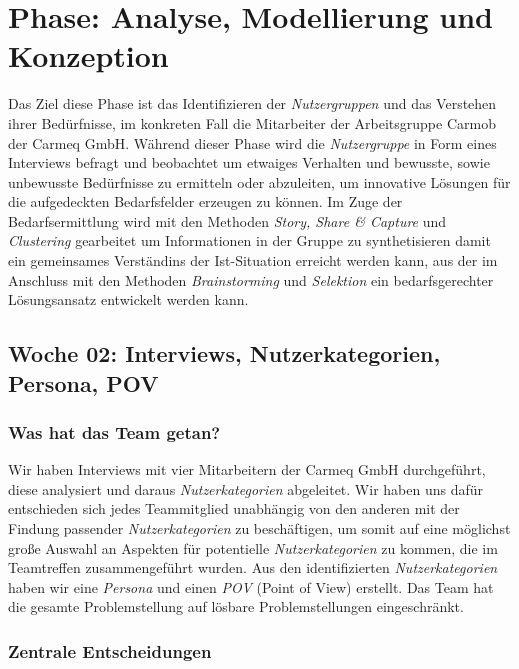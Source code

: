 \documentclass{article}
\begin{document}


\section{Phase: Analyse, Modellierung und Konzeption}

Das Ziel diese Phase ist das Identifizieren der \textit{Nutzergruppen} und das Verstehen ihrer Bed\"urfnisse, im konkreten Fall die Mitarbeiter der Arbeitsgruppe Carmob der Carmeq GmbH. W\"ahrend dieser Phase wird die \textit{Nutzergruppe} in Form eines Interviews befragt und beobachtet um etwaiges Verhalten und bewusste, sowie unbewusste Bed\"urfnisse zu ermitteln oder abzuleiten, um innovative L\"osungen f\"ur die aufgedeckten Bedarfsfelder erzeugen zu k\"onnen. Im Zuge der Bedarfsermittlung wird mit den Methoden \textit{Story, Share \& Capture} und \textit{Clustering} gearbeitet um Informationen in der Gruppe zu synthetisieren damit ein gemeinsames Verst\"andins der Ist-Situation erreicht werden kann, aus der im Anschluss mit den Methoden \textit{Brainstorming} und \textit{Selektion} ein bedarfsgerechter L\"osungsansatz entwickelt werden kann. 

\subsection{Woche 02: Interviews, Nutzerkategorien, Persona, POV}

\subsubsection{Was hat das Team getan?}

Wir haben Interviews mit vier Mitarbeitern der Carmeq GmbH durchgef\"uhrt, diese analysiert und daraus \textit{Nutzerkategorien} abgeleitet. Wir haben uns daf\"ur entschieden sich jedes Teammitglied unabh\"angig von den anderen mit der Findung passender \textit{Nutzerkategorien} zu besch\"aftigen, um somit auf eine m\"oglichst gro\ss e Auswahl an Aspekten f\"ur potentielle \textit{Nutzerkategorien} zu kommen, die im Teamtreffen zusammengef\"uhrt wurden. Aus den identifizierten \textit{Nutzerkategorien} haben wir eine \textit{Persona} und einen \textit{POV} (Point of View) erstellt. Das Team hat die gesamte Problemstellung auf l\"osbare Problemstellungen eingeschr\"ankt.

\subsubsection{Zentrale Entscheidungen}
\end{document}
